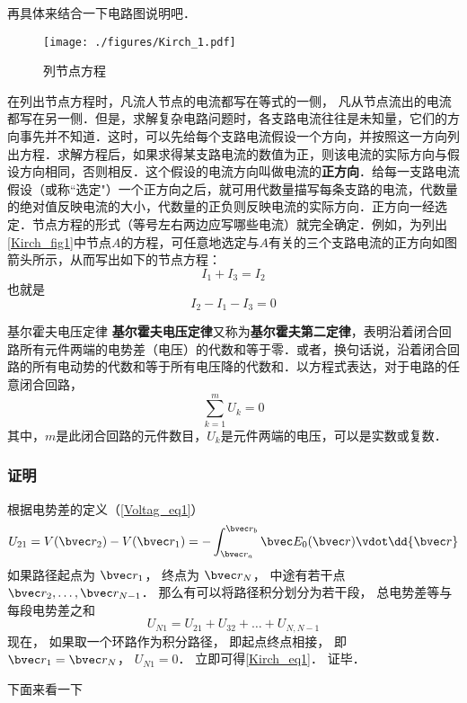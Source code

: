 再具体来结合一下电路图说明吧．
\begin{figure}[ht]
\centering
\texttt{[image: ./figures/Kirch\_1.pdf]}
\caption{列节点方程} \label{Kirch_fig1}
\end{figure}
在列出节点方程时，凡流人节点的电流都写在等式的一侧， 凡从节点流出的电流都写在另一侧．但是，求解复杂电路问题时，各支路电流往往是未知量，它们的方向事先并不知道．这时，可以先给每个支路电流假设一个方向，并按照这一方向列出方程．求解方程后，如果求得某支路电流的数值为正，则该电流的实际方向与假设方向相同，否则相反．这个假设的电流方向叫做电流的\textbf{正方向}．给每一支路电流假设（或称“选定"）一个正方向之后，就可用代数量描写每条支路的电流，代数量的绝对值反映电流的大小，代数量的正负则反映电流的实际方向．正方向一经选定．节点方程的形式（等号左右两边应写哪些电流）就完全确定．例如，为列出\autoref{Kirch_fig1}中节点$A$的方程，可任意地选定与$A $有关的三个支路电流的正方向如图箭头所示，从而写出如下的节点方程：
\begin{equation}
I_1+I_3=I_2
\end{equation}
也就是
\begin{equation}
I_2-I_1-I_3=0
\end{equation}
\begin{theorem}{基尔霍夫电压定律}
\textbf{基尔霍夫电压定律}又称为\textbf{基尔霍夫第二定律}，表明沿着闭合回路所有元件两端的电势差（电压）的代数和等于零．或者，换句话说，沿着闭合回路的所有电动势的代数和等于所有电压降的代数和．以方程式表达，对于电路的任意闭合回路，
\begin{equation}\label{Kirch_eq1}
\sum_{k=1}^m U_k = 0
\end{equation}
其中，$m$是此闭合回路的元件数目，$U_k$是元件两端的电压，可以是实数或复数．
\end{theorem}

\subsubsection{证明}
根据电势差的定义（\autoref{Voltag_eq1}）
\begin{equation}
U_{21} = V(\bvec r_2) - V(\bvec r_1) = - \int_{\bvec r_a}^{\bvec r_b} \bvec E_0(\bvec r) \vdot \dd{\bvec r}
\end{equation}
如果路径起点为 $\bvec r_1$， 终点为 $\bvec r_N$， 中途有若干点 $\bvec r_2, \dots, \bvec r_{N-1}$． 那么有可以将路径积分划分为若干段， 总电势差等与每段电势差之和
\begin{equation}
U_{N1} = U_{21} + U_{32} + \dots + U_{N, N-1}
\end{equation}
现在， 如果取一个环路作为积分路径， 即起点终点相接， 即 $\bvec r_1 = \bvec r_N$， $U_{N1} = 0$． 立即可得\autoref{Kirch_eq1}． 证毕．

下面来看一下